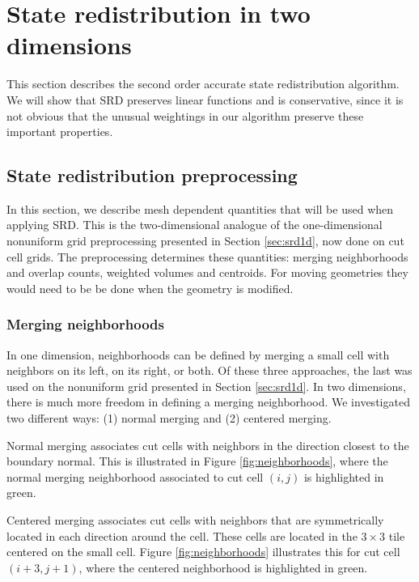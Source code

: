 \section{State redistribution in two dimensions}\label{sec:srdAlg}

This section describes the second order accurate
state redistribution algorithm. 
We will show that SRD preserves linear functions and is conservative, since
it is not obvious that the unusual weightings in our algorithm
preserve these important properties.

\subsection{State redistribution preprocessing}\label{sec:preprocessing}


In this section, we describe mesh dependent quantities that will be used when applying 
SRD. This is the two-dimensional analogue of the one-dimensional 
nonuniform grid preprocessing presented in Section \ref{sec:srd1d}, now done on cut cell grids.
The preprocessing determines these quantities: merging neighborhoods and overlap counts, 
weighted volumes and centroids.
For moving geometries they would need to be be done when the geometry is modified.

\subsubsection*{Merging neighborhoods}

In one dimension, neighborhoods can be defined by merging a small cell with neighbors on its left, on its right, or both.  Of these three approaches, the last was used on the nonuniform grid presented in Section \ref{sec:srd1d}.
In two dimensions, there is much more freedom in defining a merging neighborhood.  
We investigated two different ways: (1) normal merging and (2) centered merging.

Normal merging associates cut cells with neighbors in the direction closest to the 
boundary normal.  This is illustrated in Figure \ref{fig:neighborhoods}, where the normal merging neighborhood associated to cut cell $(i,j)$ is highlighted in green.

Centered merging associates cut cells with neighbors that are 
symmetrically located in each direction around the cell.
These cells are located in the $3 \times 3$ tile centered on the small cell.  Figure \ref{fig:neighborhoods}
illustrates this for cut cell $(i+3,j+1)$, where the centered neighborhood is highlighted in green.

